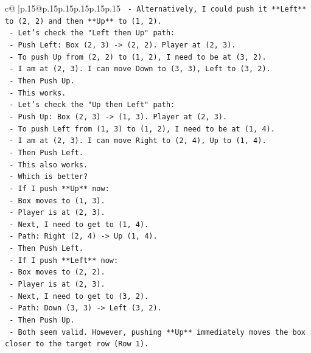 \documentclass{article}
\begin{document}
{\begin{supertabular}{c@{$\;$}|p{.15\linewidth}@{}p{.15\linewidth}p{.15\linewidth}p{.15\linewidth}p{.15\linewidth}p{.15\linewidth}}
{{{\texttt{    {-} Alternatively, I could push it **Left** to (2, 2) and then **Up** to (1, 2).} \\
\texttt{    {-} Let's check the "Left then Up" path:} \\
\texttt{        {-} Push Left: Box (2, 3) {-}> (2, 2). Player at (2, 3).} \\
\texttt{        {-} To push Up from (2, 2) to (1, 2), I need to be at (3, 2).} \\
\texttt{        {-} I am at (2, 3). I can move Down to (3, 3), Left to (3, 2).} \\
\texttt{        {-} Then Push Up.} \\
\texttt{        {-} This works.} \\
\texttt{    {-} Let's check the "Up then Left" path:} \\
\texttt{        {-} Push Up: Box (2, 3) {-}> (1, 3). Player at (2, 3).} \\
\texttt{        {-} To push Left from (1, 3) to (1, 2), I need to be at (1, 4).} \\
\texttt{        {-} I am at (2, 3). I can move Right to (2, 4), Up to (1, 4).} \\
\texttt{        {-} Then Push Left.} \\
\texttt{        {-} This also works.} \\
\texttt{    {-} Which is better?} \\
\texttt{        {-} If I push **Up** now:} \\
\texttt{            {-} Box moves to (1, 3).} \\
\texttt{            {-} Player is at (2, 3).} \\
\texttt{            {-} Next, I need to get to (1, 4).} \\
\texttt{            {-} Path: Right (2, 4) {-}> Up (1, 4).} \\
\texttt{            {-} Then Push Left.} \\
\texttt{        {-} If I push **Left** now:} \\
\texttt{            {-} Box moves to (2, 2).} \\
\texttt{            {-} Player is at (2, 3).} \\
\texttt{            {-} Next, I need to get to (3, 2).} \\
\texttt{            {-} Path: Down (3, 3) {-}> Left (3, 2).} \\
\texttt{            {-} Then Push Up.} \\
\texttt{    {-} Both seem valid. However, pushing **Up** immediately moves the box closer to the target row (Row 1).} \\
}}}
\end{supertabular}}
\end{document}

